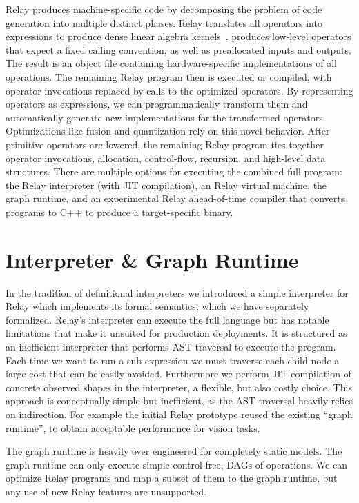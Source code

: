 Relay produces machine-specific code
    by decomposing the problem of code generation into multiple distinct phases.
Relay translates all operators into \tvm expressions
    to produce dense linear algebra kernels~\citep{tvm_osdi18, tensor_comprehensions, halide}.
\tvm produces low-level operators that expect a fixed calling convention,
    as well as preallocated inputs and outputs.
The result is an object file containing hardware-specific implementations of all
    operations.
The remaining Relay program then is executed or compiled,
    with operator invocations replaced by calls to the optimized operators.
By representing operators as \tvm expressions, we can programmatically
    transform them and automatically generate new implementations for the transformed operators.
Optimizations like fusion and quantization
    rely on this novel behavior.
After primitive operators are lowered,
    the remaining Relay program ties
    together operator invocations, allocation, control-flow,
    recursion, and high-level data structures.
There are multiple options for executing the combined full program:
    the Relay interpreter (with JIT compilation),
    an Relay virtual machine,
    the \tvm graph runtime,
    and an experimental Relay ahead-of-time compiler
    that converts programs to C++ to produce a target-specific binary.

\section{Interpreter \& Graph Runtime}
\label{sec:interp_graph_rt}

In the tradition of definitional interpreters we introduced
  a simple interpreter for Relay which implements its formal semantics, which
  we have separately formalized.
Relay’s interpreter can execute the full language but has notable limitations
  that make it unsuited for production deployments.
It is structured as an inefficient interpreter that performs
  AST traversal to execute the program.
Each time we want to run a sub-expression we must traverse each child node
  a large cost that can be easily avoided.
Furthermore we perform JIT compilation of concrete observed shapes in the
  interpreter, a flexible, but also costly choice.
This approach is conceptually simple but inefficient, as the AST traversal heavily relies on indirection.
For example the initial Relay prototype reused the existing ``graph runtime'', to obtain
  acceptable performance for vision tasks.

The graph runtime is heavily over engineered for completely static
  models.
The graph runtime can only execute simple control-free,
    DAGs of operations.
We can optimize Relay programs and map a subset of them
    to the graph runtime, but any use of new Relay features
    are unsupported.

